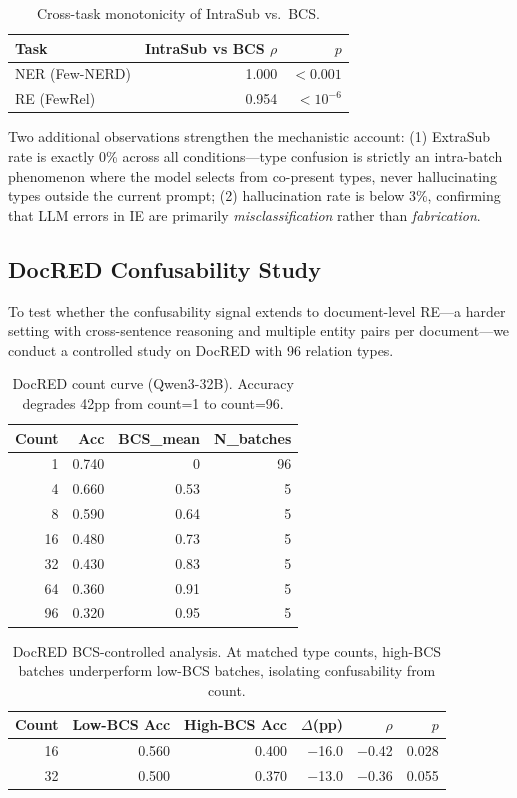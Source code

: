 \documentclass[11pt,a4paper]{article}
\begin{document}
\begin{table}[t]
\centering
\caption{Cross-task monotonicity of IntraSub vs.\ BCS.}
\label{tab:cross-task}
\begin{tabular}{lrr}
\toprule
Task & IntraSub vs BCS $\rho$ & $p$ \\
\midrule
NER (Few-NERD)  & 1.000 & ${<}0.001$ \\
RE (FewRel)     & 0.954 & ${<}10^{-6}$ \\
\bottomrule
\end{tabular}
\end{table}

Two additional observations strengthen the mechanistic account: (1) ExtraSub rate is exactly 0\% across all conditions---type confusion is strictly an intra-batch phenomenon where the model selects from co-present types, never hallucinating types outside the current prompt; (2) hallucination rate is below 3\%, confirming that LLM errors in IE are primarily \emph{misclassification} rather than \emph{fabrication}.

\subsection{DocRED Confusability Study}
\label{sec:docred}

To test whether the confusability signal extends to document-level RE---a harder setting with cross-sentence reasoning and multiple entity pairs per document---we conduct a controlled study on DocRED with 96 relation types.

\begin{table}[t]
\centering
\caption{DocRED count curve (Qwen3-32B). Accuracy degrades 42pp from count=1 to count=96.}
\label{tab:docred-count}
\begin{tabular}{rrrr}
\toprule
Count & Acc & BCS\_mean & N\_batches \\
\midrule
1  & 0.740 & 0    & 96 \\
4  & 0.660 & 0.53 & 5  \\
8  & 0.590 & 0.64 & 5  \\
16 & 0.480 & 0.73 & 5  \\
32 & 0.430 & 0.83 & 5  \\
64 & 0.360 & 0.91 & 5  \\
96 & 0.320 & 0.95 & 5  \\
\bottomrule
\end{tabular}
\end{table}

\begin{table}[t]
\centering
\caption{DocRED BCS-controlled analysis. At matched type counts, high-BCS batches underperform low-BCS batches, isolating confusability from count.}
\label{tab:docred-bcs}
\begin{tabular}{rrrrrr}
\toprule
Count & Low-BCS Acc & High-BCS Acc & $\Delta$(pp) & $\rho$ & $p$ \\
\midrule
16 & 0.560 & 0.400 & $-$16.0 & $-$0.42 & 0.028 \\
32 & 0.500 & 0.370 & $-$13.0 & $-$0.36 & 0.055 \\
\bottomrule
\end{tabular}
\end{table}
\end{document}
